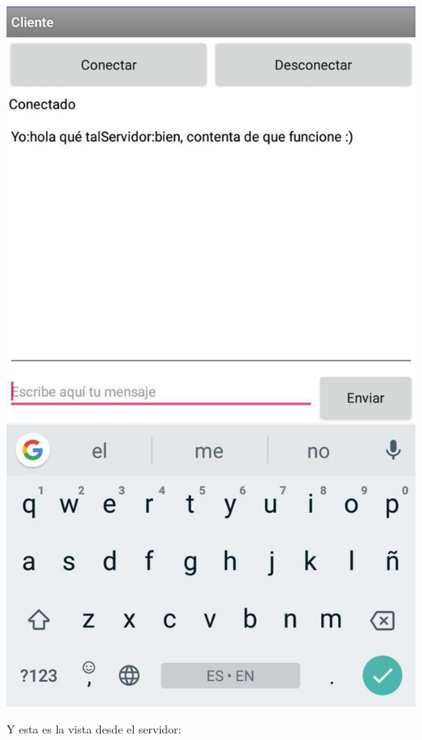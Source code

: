 \documentclass{article}
\begin{document}
\begin{flushleft}
	\includegraphics[scale=0.2]{imagenes/ChatClient.jpg} 
\end{flushleft}

Y esta es la vista desde el servidor:
\end{document}
